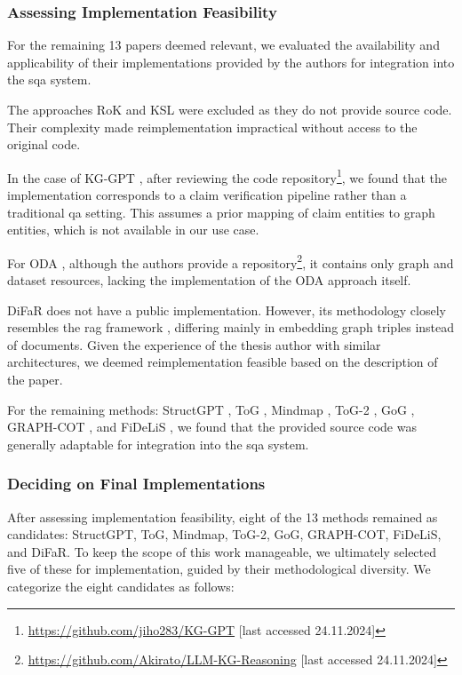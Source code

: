 \subsubsection{Assessing Implementation Feasibility}

For the remaining 13 papers deemed relevant, we evaluated the availability and applicability of their implementations provided by the authors for integration into the \gls{sqa} system.

The approaches RoK \cite{wang_reasoning_2024} and KSL \cite{feng_knowledge_2023} were excluded as they do not provide source code. Their complexity made reimplementation impractical without access to the original code.

In the case of KG-GPT \cite{kim_kg-gpt_2023}, after reviewing the code repository\footnote{\url{https://github.com/jiho283/KG-GPT} [last accessed 24.11.2024]}, we found that the implementation corresponds to a claim verification pipeline rather than a traditional \gls{qa} setting. This assumes a prior mapping of claim entities to graph entities, which is not available in our use case.

For ODA \cite{sun_oda_2024}, although the authors provide a repository\footnote{\url{https://github.com/Akirato/LLM-KG-Reasoning} [last accessed 24.11.2024]}, it contains only graph and dataset resources, lacking the implementation of the ODA approach itself.

DiFaR \cite{baek_direct_2023} does not have a public implementation. However, its methodology closely resembles the \gls{rag} framework \cite{lewis_retrieval-augmented_2021}, differing mainly in embedding graph triples instead of documents. Given the experience of the thesis author with similar architectures, we deemed reimplementation feasible based on the description of the paper.

For the remaining methods: StructGPT \cite{jiang_structgpt_2023}, ToG \cite{sun_think--graph_2024}, Mindmap \cite{wen_mindmap_2024}, ToG-2 \cite{ma_think--graph_2024}, GoG \cite{xu_generate--graph_2024}, GRAPH-COT \cite{jin_graph_2024}, and FiDeLiS \cite{sui_fidelis_2024}, we found that the provided source code was generally adaptable for integration into the \gls{sqa} system.

\subsubsection{Deciding on Final Implementations}

After assessing implementation feasibility, eight of the 13 methods remained as candidates: StructGPT, ToG, Mindmap, ToG-2, GoG, GRAPH-COT, FiDeLiS, and DiFaR. To keep the scope of this work manageable, we ultimately selected five of these for implementation, guided by their methodological diversity. We categorize the eight candidates as follows:


